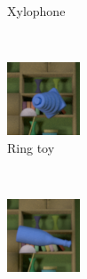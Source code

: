 \documentclass{jov}
\begin{document}
\begin{figure}
\begin{subfigure}[b]{0.14 \textwidth}
        \caption{Xylophone}
        \label{fig:libraryWithXylophone}
    \end{subfigure}
    ~
	\begin{subfigure}[b]{0.14 \textwidth}
        \includegraphics[width=\textwidth]{../Figures/Figure4/Figure4_e.png}
        \caption{Ring toy}
        \label{fig:libraryWithRingToy}
    \end{subfigure}
        ~
    	\begin{subfigure}[b]{0.14 \textwidth}
        \includegraphics[width=\textwidth]{../Figures/Figure4/Figure4_f.png}

\end{subfigure}
\end{figure}
\end{document}
